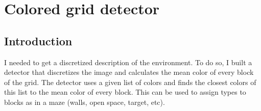 \section{Colored grid detector}




\subsection{Introduction}
I needed to get a discretized description of the environment. To do so, 
I built a detector that discretizes the image and calculates the mean 
color of every block of the grid. The detector uses a given list of 
colors and finds the closest colors of this list to the mean color of 
every block. This can be used to assign types to blocks as in a maze 
(walls, open space, target, etc).

